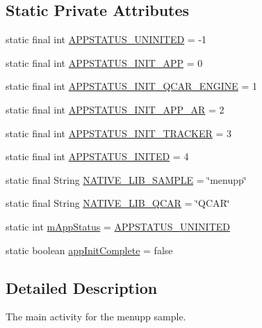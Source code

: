 \subsection*{\-Static \-Private \-Attributes}
\begin{DoxyCompactItemize}
\item 
static final int \hyperlink{classsrdes_1_1menupp_1_1menupp_a4b5b4bf7165545c040818c88e1041b6f}{\-A\-P\-P\-S\-T\-A\-T\-U\-S\-\_\-\-U\-N\-I\-N\-I\-T\-E\-D} = -\/1
\item 
static final int \hyperlink{classsrdes_1_1menupp_1_1menupp_a2b78a9f312d274a1b4ea62101a15d8a1}{\-A\-P\-P\-S\-T\-A\-T\-U\-S\-\_\-\-I\-N\-I\-T\-\_\-\-A\-P\-P} = 0
\item 
static final int \hyperlink{classsrdes_1_1menupp_1_1menupp_acd2f8309c70a15b640e68d01271710f4}{\-A\-P\-P\-S\-T\-A\-T\-U\-S\-\_\-\-I\-N\-I\-T\-\_\-\-Q\-C\-A\-R\-\_\-\-E\-N\-G\-I\-N\-E} = 1
\item 
static final int \hyperlink{classsrdes_1_1menupp_1_1menupp_a2483ff5662e975e2abe7cfa7cf7f37c9}{\-A\-P\-P\-S\-T\-A\-T\-U\-S\-\_\-\-I\-N\-I\-T\-\_\-\-A\-P\-P\-\_\-\-A\-R} = 2
\item 
static final int \hyperlink{classsrdes_1_1menupp_1_1menupp_a76729ba8c6498dbd3ae6aa935530114e}{\-A\-P\-P\-S\-T\-A\-T\-U\-S\-\_\-\-I\-N\-I\-T\-\_\-\-T\-R\-A\-C\-K\-E\-R} = 3
\item 
static final int \hyperlink{classsrdes_1_1menupp_1_1menupp_a192223ffc7bc97abebbf5eb1c9e5cbe6}{\-A\-P\-P\-S\-T\-A\-T\-U\-S\-\_\-\-I\-N\-I\-T\-E\-D} = 4
\item 
static final \-String \hyperlink{classsrdes_1_1menupp_1_1menupp_a4822aae85b4ade538c55138d6f792f3f}{\-N\-A\-T\-I\-V\-E\-\_\-\-L\-I\-B\-\_\-\-S\-A\-M\-P\-L\-E} = \char`\"{}menupp\char`\"{}
\item 
static final \-String \hyperlink{classsrdes_1_1menupp_1_1menupp_a21c0b1d044c2c6b558f823923396637c}{\-N\-A\-T\-I\-V\-E\-\_\-\-L\-I\-B\-\_\-\-Q\-C\-A\-R} = \char`\"{}\-Q\-C\-A\-R\char`\"{}
\item 
static int \hyperlink{classsrdes_1_1menupp_1_1menupp_a859ce1b7b079e1266190eb6337488bf3}{m\-App\-Status} = \hyperlink{classsrdes_1_1menupp_1_1menupp_a4b5b4bf7165545c040818c88e1041b6f}{\-A\-P\-P\-S\-T\-A\-T\-U\-S\-\_\-\-U\-N\-I\-N\-I\-T\-E\-D}
\item 
static boolean \hyperlink{classsrdes_1_1menupp_1_1menupp_aebeb6437dbc260271b1f887a9df840e2}{app\-Init\-Complete} = false
\end{DoxyCompactItemize}


\subsection{\-Detailed \-Description}
\-The main activity for the menupp sample. 

